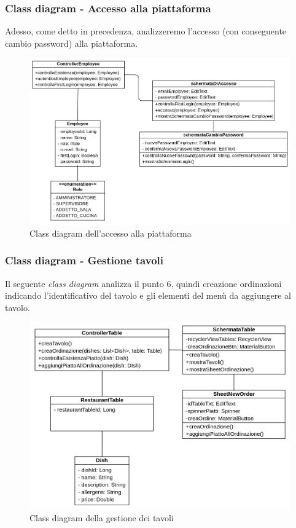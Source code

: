 \subsubsection{Class diagram - Accesso alla piattaforma}
Adesso, come detto in precedenza, analizzeremo l'accesso (con conseguente cambio password) alla piattaforma.
\begin{figure}[H]
  \centering
  \includegraphics[scale=0.5]{img/class_diagrams/accessoCambioPassword_class_diagram.png}
  \caption{Class diagram dell'accesso alla piattaforma}
\end{figure}
\subsubsection{Class diagram - Gestione tavoli}
Il seguente \textit{class diagram} analizza il punto 6, quindi creazione ordinazioni indicando l'identificativo del tavolo e gli elementi del menù da aggiungere al tavolo.
\begin{figure}[H]
  \centering
  \includegraphics[scale=0.5]{img/class_diagrams/gestioneTavoli_class_diagram.png}
  \caption{Class diagram della gestione dei tavoli}
\end{figure}
\newpage
